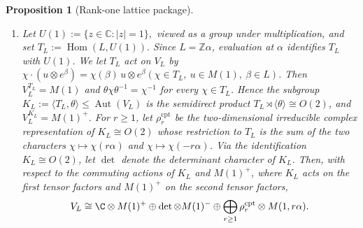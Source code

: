 \documentclass[12pt,leqno]{amsart}
\numberwithin{equation}{section} \newtheorem{thm}{Theorem}[section] \newtheorem{lem}[thm]{Lemma} \newtheorem{ex}[thm]{Example} \newtheorem{prop}[thm]{Proposition} \newtheorem{cor}[thm]{Corollary} \newtheorem{defi}[thm]{Definition} \newtheorem{rmk}[thm]{Remark} \newtheorem{notation}[thm]{Notation}
\newcommand{\Aut}{\operatorname{Aut}}
\newcommand{\Hom}{\operatorname{Hom}}
\begin{document}
\begin{prop}[Rank-one lattice package]
\begin{enumerate}[label=\textnormal{(\roman*)}]
\item Let
$ U(1):=\{z\in\mathbb C:|z|=1\}, $ viewed as a group under multiplication, and set $ T_L:=\Hom(L,U(1)). $ Since $L=\mathbb Z\alpha$, evaluation at $\alpha$ identifies $T_L$ with $U(1)$. We let $T_L$ act on $V_L$ by \(\chi\cdot(u\otimes e^\beta) =\chi(\beta)\,u\otimes e^\beta (\chi\in T_L,\ u\in M(1),\ \beta\in L)\). Then $V_L^{T_L}=M(1)$ and $\theta\chi\theta^{-1}=\chi^{-1}$ for every $\chi\in T_L$. Hence the subgroup \(K_L:=\langle T_L,\theta\rangle\le\Aut(V_L)\) is the semidirect product $T_L\rtimes\langle\theta\rangle\cong O(2)$, and $V_L^{K_L}=M(1)^+$. For $r\ge1$, let $\rho_r^{\mathrm{cpt}}$ be the two-dimensional irreducible complex representation of $K_L\cong O(2)$ whose restriction to $T_L$ is the sum of the two characters $\chi\mapsto\chi(r\alpha)$ and $\chi\mapsto\chi(-r\alpha)$. Via the identification \(K_L\cong O(2)\), let \(\det\) denote the determinant character of \(K_L\). Then, with respect to the commuting actions of \(K_L\) and \(M(1)^+\), where \(K_L\) acts on the first tensor factors and \(M(1)^+\) on the second tensor factors,
\begin{equation}\label{eq:rank-one-O2-Schur-Weyl}
V_L\cong
\C\otimes M(1)^+
\oplus\det\otimes M(1)^-
\oplus\bigoplus_{r\ge1}
\rho_r^{\mathrm{cpt}}\otimes M(1,r\alpha).
\end{equation}
\end{enumerate}
\end{prop}
\end{document}
